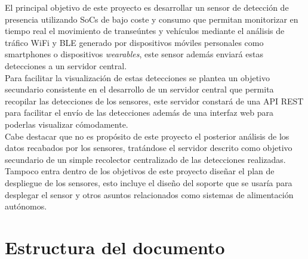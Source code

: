 \documentclass[../proyecto.tex]{subfiles}
\begin{document}
El principal objetivo de este proyecto es desarrollar un sensor de detección de presencia utilizando SoCs de bajo coste y consumo que permitan monitorizar en tiempo real el movimiento de transeúntes y vehículos mediante el análisis de tráfico WiFi y BLE generado por dispositivos móviles personales como smartphones o dispositivos \textit{wearables}, este sensor además enviará estas detecciones a un servidor central.\\

Para facilitar la visualización de estas detecciones se plantea un objetivo secundario consistente en el desarrollo de un servidor central que permita recopilar las detecciones de los sensores, este servidor constará de una API REST para facilitar el envío de las detecciones además de una interfaz web para poderlas visualizar cómodamente.\\

Cabe destacar que no es propósito de este proyecto el posterior análisis de los datos recabados por los sensores, tratándose el servidor descrito como objetivo secundario de un simple recolector centralizado de las detecciones realizadas. Tampoco entra dentro de los objetivos de este proyecto diseñar el plan de despliegue de los sensores, esto incluye el diseño del soporte que se usaría para desplegar el sensor y otros asuntos relacionados como sistemas de alimentación autónomos.\\

\section{Estructura del documento}
\end{document}
